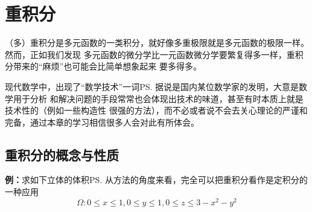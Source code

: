 \setcounter{chapter}{9}

\chapter{重积分}

（多）重积分是多元函数的一类积分，就好像多重极限就是多元函数的极限一样。然而，正如我们发现
多元函数的微分学比一元函数微分学要繁复得多一样，重积分带来的“麻烦”也可能会比简单想象起来
要多得多。

现代数学中，出现了“数学技术”一词\ps{据说是国内某位数学家的发明}，大意是数学用于分析
和解决问题的手段常常也会体现出技术的味道，甚至有时本质上就是技术性的（例如一些构造性
很强的方法），而不必或者说不会去关心理论的严谨和完备，通过本章的学习相信很多人会对此有所体会。



\section{重积分的概念与性质}

{\bf 例：}求如下立体的体积\ps{从方法的角度来看，完全可以把重积分看作是定积分的一种应用}
$$\Omega:0\leq x\leq 1,0\leq y\leq 1,0\leq z\leq 3-x^2-y^2$$

